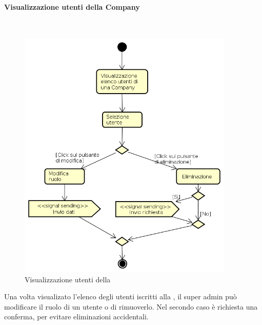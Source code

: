 \paragraph{Visualizzazione utenti della Company} \mbox{} \\
\begin{figure}[H]
\begin{center}
\includegraphics[height=12cm]{res/sections/backend/activities/operazioniUtentiSA.png}
\caption{Visualizzazione utenti della }
\end{center}
\end{figure}
Una volta visualizato l'elenco degli utenti iscritti alla , il super admin può modificare il ruolo di un utente o di rimuoverlo. Nel secondo caso è richiesta una conferma, per evitare eliminazioni accidentali.
